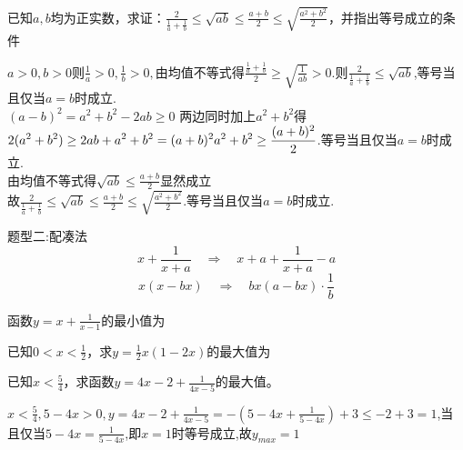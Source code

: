 \par
\begin{problem}
    已知$a,b$均为正实数，求证：$\displaystyle \frac{2}{\frac{1}{a}+\frac{1}{b}}\le\sqrt{ab}\le\frac{a+b}{2}\le\sqrt{\frac{a^2+b^2}{2}}$，并指出等号成立的条件
    \begin{jiexi}
        $\displaystyle a>0,b>0\text{则}\frac{1}{a}>0,\frac{1}{b}>0,$由均值不等式得$\displaystyle \frac{\frac{1}{a}+\frac{1}{b}}{2}\ge\sqrt{\frac{1}{ab}}>0.\text{则}\frac{2}{\frac{1}{a}+\frac{1}{b}}\le\sqrt{ab} $,等号当且仅当$a=b$时成立.\\
        $(a-b)^2 = a^2+b^2-2ab \ge 0$
        两边同时加上$a^2+b^2$得$\displaystyle 2(a^2+b^2)\ge 2ab +a^2+b^2=(a+b)^2\\
        a^2+b^2\ge \frac{(a+b)^2}{2} $.等号当且仅当$\displaystyle a=b$时成立.\\
        由均值不等式得$\displaystyle \sqrt{ab}\le\frac{a+b}{2}$显然成立\\
        故$\displaystyle \frac{2}{\frac{1}{a}+\frac{1}{b}}\le\sqrt{ab}\le\frac{a+b}{2}\le\sqrt{\frac{a^2+b^2}{2}}$.等号当且仅当$\displaystyle a=b$时成立.
    \end{jiexi}
\end{problem}



\begin{tcolorbox} 
\centering
题型二:配凑法
\tcblower %
$$x+\frac{1}{x+a} \quad \Rightarrow \quad x+a+\frac{1}{x+a}-a$$
$$x(x-bx) \quad \Rightarrow \quad bx(a-bx)\cdot \frac{1}{b} $$
\end{tcolorbox}


\par
\begin{problem}
    函数$\displaystyle y=x+\frac{1}{x-1}$的最小值为
\end{problem}

\par
\begin{problem}
    已知$\displaystyle 0<x<\frac{1}{2}$，求$\displaystyle y=\frac{1}{2}x(1-2x)$的最大值为
\end{problem}

\par
\begin{problem}
    已知$\displaystyle x<\frac{5}{4}$，求函数$\displaystyle y=4x-2+\frac{1}{4x-5}$的最大值。
    \begin{jiexi}
        $\displaystyle x<\frac{5}{4},5-4x>0,y=4x-2+\frac{1}{4x-5}=-(5-4x+\frac{1}{5-4x})+3\le-2+3=1$,当且仅当$\displaystyle 5-4x=\frac{1}{5-4x}$,即$x=1$时等号成立,故$y_{max}=1$
    \end{jiexi}
\end{problem}

